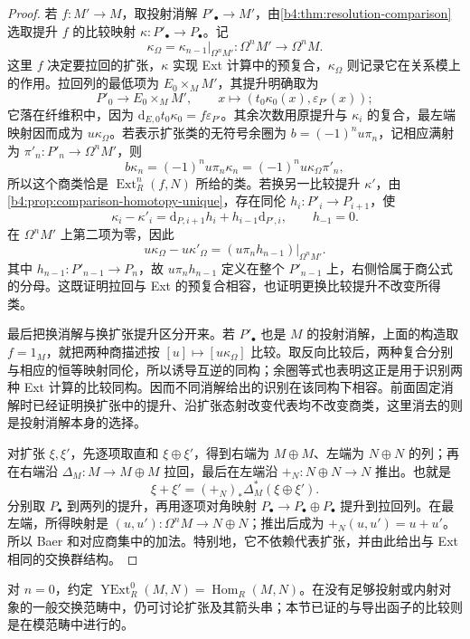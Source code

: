 \begin{proof}
	若 \(f:M'\to M\)，取投射消解 \(P'_\bullet\to M'\)，由\cref{b4:thm:resolution-comparison}选取提升 \(f\) 的比较映射 \(\kappa:P'_\bullet\to P_\bullet\)。记
	\[
		\kappa_\Omega=\kappa_{n-1}|_{\Omega^nM'}:\Omega^nM'\longrightarrow\Omega^nM.
	\]
	这里 \(f\) 决定要拉回的扩张，\(\kappa\) 实现 Ext 计算中的预复合，\(\kappa_\Omega\) 则记录它在关系模上的作用。拉回列的最低项为 \(E_0\times_M M'\)，其提升明确取为
	\[
		P'_0\longrightarrow E_0\times_M M',\qquad x\longmapsto(t_0\kappa_0(x),\varepsilon_{P'}(x));
	\]
	它落在纤维积中，因为 \(\mathrm{d}_{E,0}t_0\kappa_0=f\varepsilon_{P'}\)。其余次数用原提升与 \(\kappa_i\) 的复合，最左端映射因而成为 \(u\kappa_\Omega\)。若表示扩张类的无符号余圈为 \(b=(-1)^nu\pi_n\)，记相应满射为 \(\pi'_n:P'_n\to\Omega^nM'\)，则
	\[
		b\kappa_n=(-1)^nu\pi_n\kappa_n=(-1)^nu\kappa_\Omega\pi'_n,
	\]
	所以这个商类恰是 \(\operatorname{Ext}_R^n(f,N)\) 所给的类。若换另一比较提升 \(\kappa'\)，由\cref{b4:prop:comparison-homotopy-unique}，存在同伦 \(h_i:P'_i\to P_{i+1}\)，使
	\[
		\kappa_i-\kappa'_i=\mathrm{d}_{P,i+1}h_i+h_{i-1}\mathrm{d}_{P',i},\qquad h_{-1}=0.
	\]
	在 \(\Omega^nM'\) 上第二项为零，因此
	\[
		u\kappa_\Omega-u\kappa'_\Omega =\left.(u\pi_nh_{n-1})\right|_{\Omega^nM'}.
	\]
	其中 \(h_{n-1}:P'_{n-1}\to P_n\)，故 \(u\pi_nh_{n-1}\) 定义在整个 \(P'_{n-1}\) 上，右侧恰属于商公式的分母。这既证明拉回与 Ext 的预复合相容，也证明更换比较提升不改变所得类。

	最后把换消解与换扩张提升区分开来。若 \(P'_\bullet\) 也是 \(M\) 的投射消解，上面的构造取 \(f=1_M\)，就把两种商描述按 \([u]\mapsto[u\kappa_\Omega]\) 比较。取反向比较后，两种复合分别与相应的恒等映射同伦，所以诱导互逆的同构；余圈等式也表明这正是用于识别两种 Ext 计算的比较同构。因而不同消解给出的识别在该同构下相容。前面固定消解时已经证明换扩张中的提升、沿扩张态射改变代表均不改变商类，这里消去的则是投射消解本身的选择。

	对扩张 \(\xi,\xi'\)，先逐项取直和 \(\xi\oplus\xi'\)，得到右端为 \(M\oplus M\)、左端为 \(N\oplus N\) 的列；再在右端沿 \(\Delta_M:M\to M\oplus M\) 拉回，最后在左端沿 \(+_N:N\oplus N\to N\) 推出。也就是
	\[
		\xi+\xi'=(+_N)_*\Delta_M^*(\xi\oplus\xi').
	\]
	分别取 \(P_\bullet\) 到两列的提升，再用逐项对角映射 \(P_\bullet\to P_\bullet\oplus P_\bullet\) 提升到拉回列。在最左端，所得映射是 \((u,u'):\Omega^nM\to N\oplus N\)；推出后成为 \(+_N(u,u')=u+u'\)。所以 Baer 和对应商集中的加法。特别地，它不依赖代表扩张，并由此给出与 Ext 相同的交换群结构。
\end{proof}

对 \(n=0\)，约定 \(\operatorname{YExt}_R^0(M,N)=\operatorname{Hom}_R(M,N)\)。在没有足够投射或内射对象的一般交换范畴中，仍可讨论扩张及其箭头串；本节已证的与导出函子的比较则是在模范畴中进行的。

